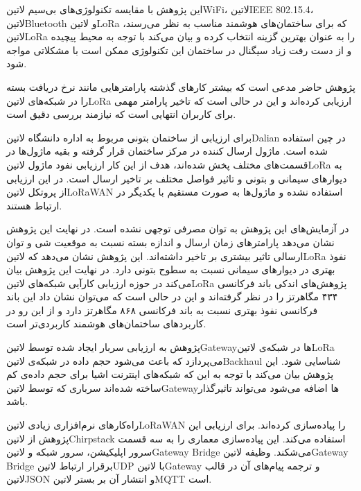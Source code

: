 این پژوهش با مقایسه تکنولوژی‌های بی‌سیم ‌لاتین{WiFi}، ‌لاتین{IEEE 802.15.4}، ‌لاتین{Bluetooth}
و ‌لاتین{LoRa} که برای ساختمان‌های هوشمند مناسب به نظر می‌رسند، ‌لاتین{LoRa} را به عنوان بهترین گزینه انتخاب کرده
و بیان می‌کند با توجه به محیط پیچیده و از دست رفت زیاد سیگنال در ساختمان این تکنولوژی ممکن است با مشکلاتی مواجه شود.

پژوهش حاضر مدعی است که بیشتر کارهای گذشته پارامترهایی مانند نرخ دریافت بسته را در شبکه‌های ‌لاتین{LoRa} ارزیابی کرده‌اند و این در حالی است
که تاخیر پارامتر مهمی برای کاربران انتهایی است که نیازمند بررسی دقیق است.

برای ارزیابی از ساختمان بتونی مربوط به اداره دانشگاه ‌لاتین{Dalian} در چین استفاده شده است. ماژول ارسال کننده در مرکز ساختمان قرار گرفته و بقیه ماژول‌ها
در قسمت‌های مختلف پخش شده‌اند، هدف از این کار ارزیابی نفود ماژول ‌لاتین{LoRa} به دیوارهای سیمانی و بتونی و تاثیر فواصل مختلف بر تاخیر ارسال است.
در این ارزیابی از پروتکل ‌لاتین{LoRaWAN} استفاده نشده و ماژول‌ها به صورت مستقیم با یکدیگر در ارتباط هستند.

در آزمایش‌های این پژوهش به توان مصرفی توجهی نشده است. در نهایت این پژوهش نشان می‌دهد پارامترهای زمان ارسال و اندازه بسته نسبت به موقعیت شی و توان ارسالی
تاثیر بیشتری بر تاخیر داشته‌اند. این پژوهش نشان می‌دهد که ‌لاتین{LoRa} نفوذ بهتری در دیوارهای سیمانی نسبت به سطوح بتونی دارد.
در نهایت این پژوهش بیان می‌کند در حوزه ارزیابی کارآیی شبکه‌های ‌لاتین{LoRa} پژوهش‌های اندکی باند فرکانسی ۴۳۴ مگاهرتز را در نظر گرفته‌اند و این در حالی است
که می‌توان نشان داد این باند فرکانسی نفوذ بهتری نسبت به باند فرکانسی ۸۶۸ مگاهرتز دارد و از این رو در کاربردهای ساختمان‌های هوشمند کاربردی‌تر است.


پژوهش  به ارزیابی سربار ایجاد شده توسط ‌لاتین{Gateway}ها در شبکه‌ی ‌لاتین{LoRa}
می‌پردازد که باعث می‌شود حجم داده در شبکه‌ی ‌لاتین{Backhaul} شناسایی شود.
این پژوهش بیان می‌کند با توجه به این که شبکه‌های اینترنت اشیا برای حجم داده‌ی کم ساخته شده‌اند سرباری که توسط ‌لاتین{Gateway}ها
اضافه می‌شود می‌تواند تاثیرگذار باشد.

راه‌کارهای نرم‌افزاری زیادی ‌لاتین{LoRaWAN} را پیاده‌سازی کرده‌اند.
برای ارزیابی این پژوهش از ‌لاتین{Chirpstack} استفاده می‌کند.
این پیاده‌سازی معماری را به سه قسمت سرور اپلیکیشن، سرور شبکه و ‌لاتین{Gateway Bridge}
می‌شکند.
وظیفه ‌لاتین{Gateway Bridge} برقرار ارتباط ‌لاتین{UDP} با ‌لاتین{Gateway} و ترجمه پیام‌های آن در قالب
‌لاتین{JSON} و انتشار آن بر بستر ‌لاتین{MQTT} است.

